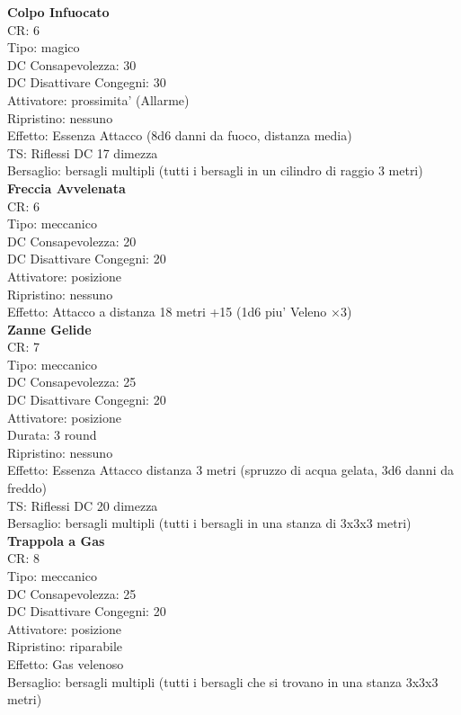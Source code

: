 \documentclass[a4paper,11pt,twoside,openany]{book}
\begin{document}
{\begin{multicols}{2}
			\textbf{Colpo Infuocato}\\
			CR: 6 \\
			Tipo: magico \\
			DC Consapevolezza: 30 \\
			DC Disattivare Congegni: 30 \\
			Attivatore: prossimita' (Allarme) \\
			Ripristino: nessuno \\
			Effetto: Essenza Attacco (8d6 danni da fuoco, distanza media)\\
			TS: Riflessi DC 17 dimezza \\
			Bersaglio: bersagli multipli (tutti i bersagli in un cilindro di raggio 3 metri)\\
			
			\textbf{Freccia Avvelenata}\\
			CR: 6 \\
			Tipo: meccanico \\
			DC Consapevolezza: 20 \\
			DC Disattivare Congegni: 20 \\
			Attivatore: posizione \\
			Ripristino: nessuno \\
			Effetto: Attacco a distanza 18 metri +15 (1d6 piu' Veleno ×3)\\
			
			\textbf{Zanne Gelide}\\
			CR: 7 \\
			Tipo: meccanico \\
			DC Consapevolezza: 25 \\
			DC Disattivare Congegni: 20 \\
			Attivatore: posizione \\
			Durata: 3 round \\
			Ripristino: nessuno \\
			Effetto: Essenza Attacco distanza 3 metri (spruzzo di acqua gelata, 3d6 danni da freddo) \\
			TS: Riflessi DC 20 dimezza \\
			Bersaglio: bersagli multipli (tutti i bersagli in una stanza di 3x3x3 metri)\\
			
			\textbf{Trappola a Gas}\\
			CR: 8 \\
			Tipo: meccanico \\
			DC Consapevolezza: 25 \\
			DC Disattivare Congegni: 20 \\
			Attivatore: posizione \\
			Ripristino: riparabile \\
			Effetto: Gas velenoso \\
			Bersaglio: bersagli multipli (tutti i bersagli che si trovano in una stanza 3x3x3 metri)\\
			

\end{multicols}}
\end{document}
